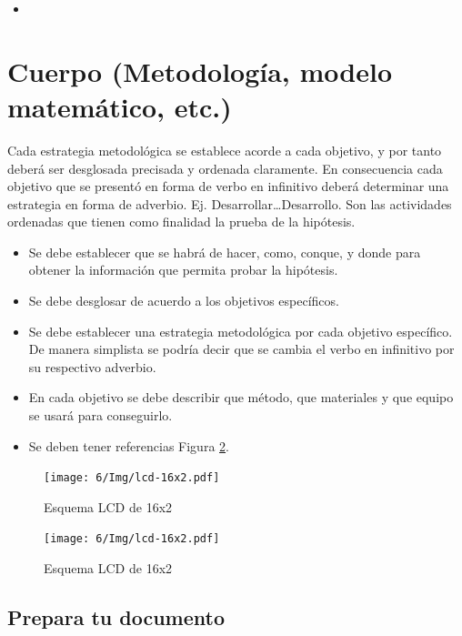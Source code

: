     \begin{itemize}
        \item 
    \end{itemize}
    
    \section{Cuerpo (Metodología, modelo matemático, etc.)}
    
    Cada estrategia metodológica se establece acorde a cada objetivo, y por tanto deberá ser desglosada precisada y ordenada claramente. En consecuencia cada objetivo que se presentó en forma de verbo en infinitivo deberá determinar una estrategia en forma de adverbio. Ej. Desarrollar…Desarrollo. Son las actividades ordenadas que tienen como finalidad la prueba de la hipótesis. 
    
    \begin{itemize}
        \item Se debe establecer que se habrá de hacer, como, conque, y donde para obtener la información que permita probar la hipótesis.  
        \item Se debe desglosar de acuerdo a los objetivos específicos. 
        \item Se debe establecer una estrategia metodológica por cada objetivo específico. De manera simplista se podría decir que se cambia el verbo en infinitivo por su respectivo adverbio.
        \item En cada objetivo se debe describir que método, que materiales y que equipo se usará para conseguirlo.
        \item Se deben tener referencias Figura \ref{fig:lcd-16x2}.
    \end{itemize}
    \begin{figure}[H]
        \centering
        \texttt{[image: 6/Img/lcd-16x2.pdf]}
        \caption{Esquema LCD de 16x2}
        \label{fig:lcd-16x2}
    \end{figure}
    \begin{figure}[H]
        \centering
        \texttt{[image: 6/Img/lcd-16x2.pdf]}
        \caption{Esquema LCD de 16x2}
        \label{fig:lcd-16x2}
    \end{figure}
    \subsection{Prepara tu documento}
    
